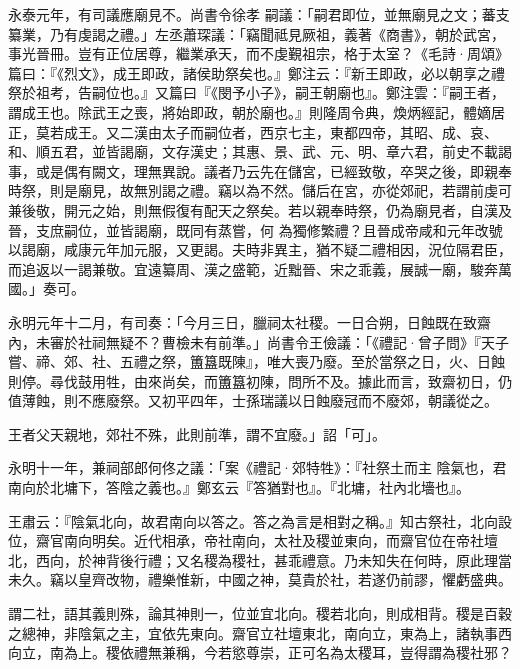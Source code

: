 \begin{pinyinscope}
 永泰元年，有司議應廟見不。尚書令徐孝
 嗣議：「嗣君即位，並無廟見之文；蕃支纂業，乃有虔謁之禮。」左丞蕭琛議：「竊聞祗見厥祖，義著《商書》，朝於武宮，事光晉冊。豈有正位居尊，繼業承天，而不虔覲祖宗，格于太室？《毛詩·周頌》篇曰：『《烈文》，成王即政，諸侯助祭矣也。』鄭注云：『新王即政，必以朝享之禮祭於祖考，告嗣位也。』又篇曰『《閔予小子》，嗣王朝廟也』。鄭注雲：『嗣王者，謂成王也。除武王之喪，將始即政，朝於廟也。』則隆周令典，煥炳經記，體嫡居正，莫若成王。又二漢由太子而嗣位者，西京七主，東都四帝，其昭、成、哀、和、順五君，並皆謁廟，文存漢史；其惠、景、武、元、明、章六君，前史不載謁事，或是偶有闕文，理無異說。議者乃云先在儲宮，已經致敬，卒哭之後，即親奉時祭，則是廟見，故無別謁之禮。竊以為不然。儲后在宮，亦從郊祀，若謂前虔可兼後敬，開元之始，則無假復有配天之祭矣。若以親奉時祭，仍為廟見者，自漢及晉，支庶嗣位，並皆謁廟，既同有蒸嘗，何
 為獨修繁禮？且晉成帝咸和元年改號以謁廟，咸康元年加元服，又更謁。夫時非異主，猶不疑二禮相因，況位隔君臣，而追返以一謁兼敬。宜遠纂周、漢之盛範，近黜晉、宋之乖義，展誠一廟，駿奔萬國。」奏可。



 永明元年十二月，有司奏：「今月三日，臘祠太社稷。一日合朔，日蝕既在致齋內，未審於社祠無疑不？曹檢未有前準。」尚書令王儉議：「《禮記·曾子問》『天子嘗、禘、郊、社、五禮之祭，簠簋既陳』，唯大喪乃廢。至於當祭之日，火、日蝕則停。尋伐鼓用牲，由來尚矣，而簠簋初陳，問所不及。據此而言，致齋初日，仍值薄蝕，則不應廢祭。又初平四年，士孫瑞議以日蝕廢冠而不廢郊，朝議從之。



 王者父天親地，郊社不殊，此則前準，謂不宜廢。」詔「可」。



 永明十一年，兼祠部郎何佟之議：「案《禮記·郊特牲》：『社祭土而主
 陰氣也，君南向於北墉下，答陰之義也。』鄭玄云『答猶對也』。『北墉，社內北墻也』。



 王肅云：『陰氣北向，故君南向以答之。答之為言是相對之稱。』知古祭社，北向設位，齋官南向明矣。近代相承，帝社南向，太社及稷並東向，而齋官位在帝社壇北，西向，於神背後行禮；又名稷為稷社，甚乖禮意。乃未知失在何時，原此理當未久。竊以皇齊改物，禮樂惟新，中國之神，莫貴於社，若遂仍前謬，懼虧盛典。



 謂二社，語其義則殊，論其神則一，位並宜北向。稷若北向，則成相背。稷是百穀之總神，非陰氣之主，宜依先東向。齋官立社壇東北，南向立，東為上，諸執事西向立，南為上。稷依禮無兼稱，今若慾尊崇，正可名為太稷耳，豈得謂為稷社邪？




\end{pinyinscope}
